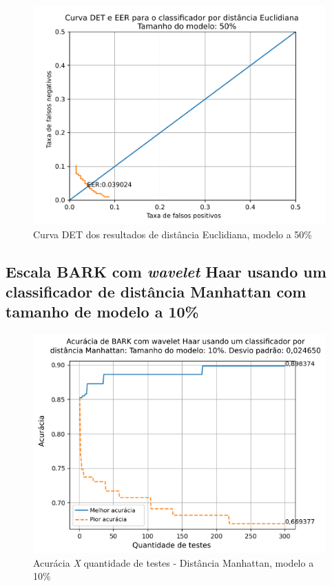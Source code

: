 			\begin{figure}[!h]
				\centering
				\includegraphics[width=.6\linewidth]{images/results/det/DET_for_classifier_Euclidian_50}
				\caption{Curva DET dos resultados de distância Euclidiana, modelo a 50\%}
				\label{fig:detforclassifiereuclidian50}
			\end{figure}
		
			\FloatBarrier
		\subsection{Escala BARK com \textit{wavelet} Haar usando um classificador de distância Manhattan com tamanho de modelo a 10\%}
		
			
	
			\begin{figure}[ht]
				\centering
				\includegraphics[width=.6\linewidth]{images/results/confusionMatrices/classifier_Manhattan_10.png}
				\caption{Acurácia \textit{X} quantidade de testes - Distância Manhattan, modelo a 10\%}
				\label{fig:classifiermanhattan10}
			\end{figure}
		
